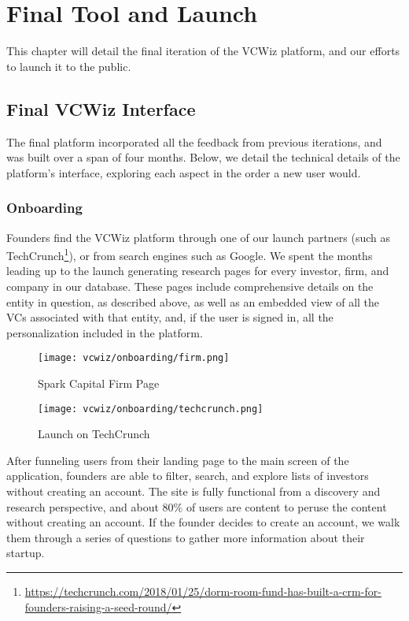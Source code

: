 \chapter{Final Tool and Launch}

This chapter will detail the final iteration of the VCWiz platform, and our efforts to launch it to the public.

\section{Final VCWiz Interface}

The final platform incorporated all the feedback from previous iterations, and was built over a span of four months. Below, we detail the technical details of the platform's interface, exploring each aspect in the order a new user would.

\subsection{Onboarding}

Founders find the VCWiz platform through one of our launch partners (such as TechCrunch\footnote{\url{https://techcrunch.com/2018/01/25/dorm-room-fund-has-built-a-crm-for-founders-raising-a-seed-round/}}), or from search engines such as Google. We spent the months leading up to the launch generating research pages for every investor, firm, and company in our database. These pages include comprehensive details on the entity in question, as described above, as well as an embedded view of all the VCs associated with that entity, and, if the user is signed in, all the personalization included in the platform.

\begin{figure}[ht]
  \centering
  \begin{minipage}{0.45\textwidth}
    \centering
    \texttt{[image: vcwiz/onboarding/firm.png]}
    \caption*{Spark Capital Firm Page}
  \end{minipage}\hfill
  \begin{minipage}{0.45\textwidth}
    \centering
    \texttt{[image: vcwiz/onboarding/techcrunch.png]}
    \caption*{Launch on TechCrunch}
  \end{minipage}
\end{figure}

After funneling users from their landing page to the main screen of the application, founders are able to filter, search, and explore lists of investors without creating an account. The site is fully functional from a discovery and research perspective, and about 80\% of users are content to peruse the content without creating an account. If the founder decides to create an account, we walk them through a series of questions to gather more information about their startup.

